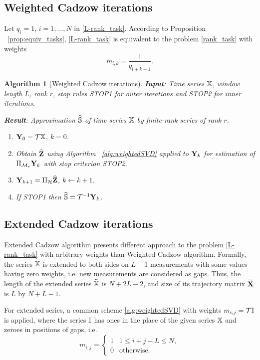 \documentclass[sii]{ipart}
\newtheorem{algorithm}{Algorithm}
\begin{document}
\subsection{Weighted Cadzow iterations}

Let $q_{i}=1$, $i = 1, \ldots, N$ in \eqref{L-rank_task}. According to Proposition ~\ref{prop:equiv_tasks},  \eqref{L-rank_task} is equivalent to the problem \eqref{rank_task} with weights
\begin{equation}
\label{Mw}
m_{l, k} = \frac{1}{q_{l + k - 1}}.
\end{equation}

\begin{algorithm}[Weighted Cadzow iterations]\label{alg:WCIt}
	\textbf{Input}: Time series $\mathbb{X}$, window length $L$, rank $r$,
	stop rules STOP1 for outer iterations and STOP2 for inner iterations.
	
	\textbf{Result}:
	Approximation $\widehat{\mathbb{S}}$ of time series $\mathbb{X}$ by finite-rank series of rank $r$.
	
	\begin{enumerate}
		\item
		$\mathbf{Y}_0 = \mathcal{T} \mathbb{X}$, $k=0$.
		\item
		Obtain $\widehat{\mathbf{Z}}$ using Algorithm ~\ref{alg:weightedSVD} applied to $\mathbf{Y}_k$ for estimation of $\Pi_{\mathcal{M}_r} \mathbf{Y}_{k}$ with stop criterion STOP2.
		\item
		$\mathbf{Y}_{k+1} = \Pi_{\mathcal{H}}  \widehat{\mathbf{Z}}$, $k\leftarrow k+1$.
		\item
		If STOP1 then $\widehat{\mathbb{S}} = \mathcal{T}^{-1} \mathbf{Y}_k$.
	\end{enumerate}
\end{algorithm}

\subsection{Extended Cadzow iterations}
Extended Cadzow algorithm presents different approach to the problem \eqref{L-rank_task} with arbitrary weights than Weighted Cadzow algorithm.
Formally, the series $\mathbb{X}$ is extended to both sides on $L-1$ measurements with some values having zero weights, i.e. new measurements are considered as gaps.
Thus, the length of the extended series $\widetilde{\mathbb{X}}$ is $N+2L-2$, and size of its trajectory matrix $\widetilde{\mathbf{X}}$ is $L$ by $N+L-1$.

For extended series, a common scheme \ref{alg:weightedSVD} with weights $m_{i,j}=\mathcal{T} \mathbb{I}$ is applied, where the series $\mathbb{I}$ has ones in the place of the given series $\mathbb{X}$ and zeroes in positions of gaps, i.e.
\begin{equation*}
m_{i,j} = \begin{cases}
1 & 1 \le i+j-L \le N, \\
0 & \text{otherwise.}
\end{cases}
\end{equation*}
\end{document}

